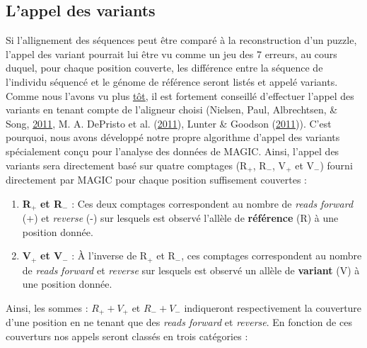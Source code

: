 \documentclass[12pt,twoside]{reedthesis}
\providecommand{\tightlist}{%
  \setlength{\itemsep}{0pt}\setlength{\parskip}{0pt}}
\theoremstyle{definition}
\theoremstyle{definition}
\theoremstyle{remark}
\begin{document}
  \newpage
  
  \subsection{L'appel des variants}\label{lappel-des-variants}
  
  Si l'allignement des séquences peut être comparé à la reconstruction
  d'un puzzle, l'appel des variant pourrait lui être vu comme un jeu des 7
  erreurs, au cours duquel, pour chaque position couverte, les différence
  entre la séquence de l'individu séquencé et le génome de référence
  seront listés et appelé variants. Comme nous l'avons vu plus
  \protect\hyperlink{varcall}{tôt}, il est fortement conseillé d'effectuer
  l'appel des variants en tenant compte de l'aligneur choisi (Nielsen,
  Paul, Albrechtsen, \& Song, \protect\hyperlink{ref-Nielsen2011}{2011},
  M. A. DePristo et al. (\protect\hyperlink{ref-DePristo2011}{2011}),
  Lunter \& Goodson (\protect\hyperlink{ref-Lunter2011}{2011})). C'est
  pourquoi, nous avons développé notre propre algorithme d'appel des
  variants spécialement conçu pour l'analyse des données de MAGIC. Ainsi,
  l'appel des variants sera directement basé sur quatre comptages
  (R\(_+\), R\(_-\), V\(_+\) et V\(_-\)) fourni directement par MAGIC pour
  chaque position suffisement couvertes :
  
  \begin{enumerate}
  \def\labelenumi{\arabic{enumi}.}
  \tightlist
  \item
    \textbf{R}\(_+\) \textbf{et R}\(_-\) : Ces deux comptages
    correspondent au nombre de \emph{reads} \emph{forward} (+) et
    \emph{reverse} (-) sur lesquels est observé l'allèle de
    \textbf{référence} (R) à une position donnée.\\
  \item
    \textbf{V}\(_+\) \textbf{et V}\(_-\) : À l'inverse de R\(_+\) et
    R\(_-\), ces comptages correspondent au nombre de \emph{reads}
    \emph{forward} et \emph{reverse} sur lesquels est observé un allèle de
    \textbf{variant} (V) à une position donnée.
  \end{enumerate}
  
  Ainsi, les sommes : \(R_+ + V_+\) et \(R_- + V_-\) indiqueront
  respectivement la couverture d'une position en ne tenant que des
  \emph{reads forward} et \emph{reverse}. En fonction de ces couverturs
  nos appels seront classés en trois catégories :
  
\end{document}
